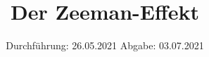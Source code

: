 



\subject{V27}  %
\title{Der Zeeman-Effekt} %
\date{%
  Durchführung: 26.05.2021
  \hspace{3em}
  Abgabe: 03.07.2021
}



\maketitle
\thispagestyle{empty}
\tableofcontents
\newpage







\printbibliography{}


